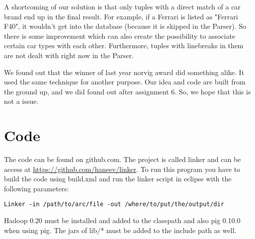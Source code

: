 \documentclass[a4paper,10pt]{article}
\begin{document}
A shortcoming of our solution is that only tuples with a direct match of a car brand end up in the final result. For example, if a Ferrari is listed as "Ferrari F40", it wouldn't get into the database (because it is skipped in the Parser). So there is some improvement which can also create the possibility to associate certain car types with each other. Furthermore, tuples with linebreaks in them are not dealt with right now in the Parser. 

We found out that the winner of last year norvig award did something alike. It used the same technique for another purpose. Our idea and code are built from the ground up, and we did found out after assignment 6. So, we hope that this is not a issue.
\appendix 

\section{Code}
The code can be found on github.com. The project is called linker and can be access at \url{https://github.com/haneev/linker}. To run this program you have to build the code using build.xml and run the linker script in eclipse with the following parameters:
\begin{lstlisting}
Linker -in /path/to/arc/file -out /where/to/put/the/output/dir
\end{lstlisting}

Hadoop 0.20 must be installed and added to the classpath and also pig 0.10.0 when using pig. The jars of lib/* must be added to the include path as well.

\lstlistoflistings
\end{document}
